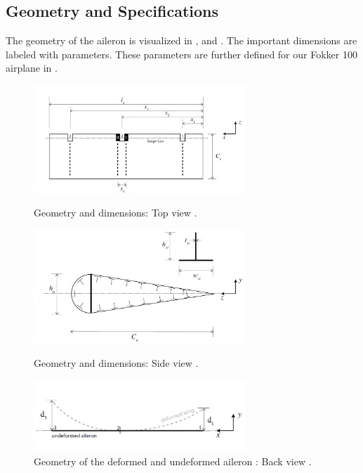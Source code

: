 \subsection{Geometry and Specifications}
The geometry of the aileron is visualized in ,  and . The important dimensions are labeled with parameters. These parameters are further defined for our Fokker 100 airplane in .



\begin{figure}[H]
\begin{minipage}[b]{0.45\linewidth}
\centering
\includegraphics[width=8cm]{Images/Dimension_top_view.jpg}
\caption{Geometry and dimensions: Top view \cite{Assignment_description}.}
\label{fig:Dimensions_top_view}
\end{minipage}
\hspace{0.5cm}
\begin{minipage}[b]{0.45\linewidth}
\centering
\includegraphics[width=8cm]{Images/Dimension_side_view.jpg}
\caption{Geometry and dimensions: Side view \cite{Assignment_description}. }
\label{fig:Dimensions_side_view}
\end{minipage}
\begin{minipage}[b]{\linewidth}
\centering
\includegraphics[width=8cm]{Images/Dimension_back_view.jpg}
\caption{Geometry of the deformed and undeformed aileron : Back view \cite{Assignment_description}.}
\label{fig:Dimensions_back_view}
\end{minipage}
\end{figure}

